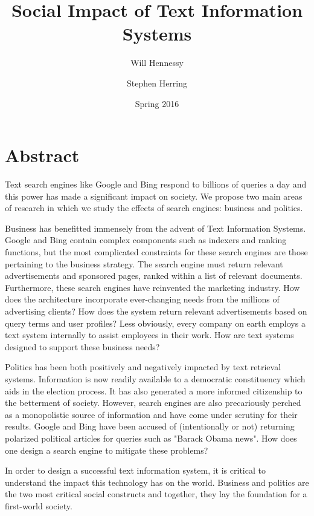\documentclass[11pt]{article}
\title{Social Impact of Text Information Systems}
\author{Will Hennessy \and Stephen Herring}
\date{Spring 2016}
\begin{document}
\maketitle

\section*{Abstract}
Text search engines like Google and Bing respond to billions of queries a day and this power has made a significant impact on society. We propose two main areas of research in which we study the effects of search engines:  business and politics.

Business has benefitted immensely from the advent of Text Information Systems. Google and Bing contain complex components such as indexers and ranking functions, but the most complicated constraints for these search engines are those pertaining to the business strategy. The search engine must return relevant advertisements and sponsored pages, ranked within a list of relevant documents. Furthermore, these search engines have reinvented the marketing industry. How does the architecture incorporate ever-changing needs from the millions of advertising clients? How does the system return relevant advertisements based on query terms and user profiles? Less obviously, every company on earth employs a text system internally to assist employees in their work. How are text systems designed to support these business needs?

Politics has been both positively and negatively impacted by text retrieval systems. Information is now readily available to a democratic constituency which aids in the election process. It has also generated a more informed citizenship to the betterment of society. However, search engines are also precariously perched as a monopolistic source of information and have come under scrutiny for their results. Google and Bing have been accused of (intentionally or not) returning polarized political articles for queries such as "Barack Obama news". How does one design a search engine to mitigate these problems?

In order to design a successful text information system, it is critical to understand the impact this technology has on the world. Business and politics are the two most critical social constructs and together, they lay the foundation for a first-world society.

\nocite{*}


\end{document}
